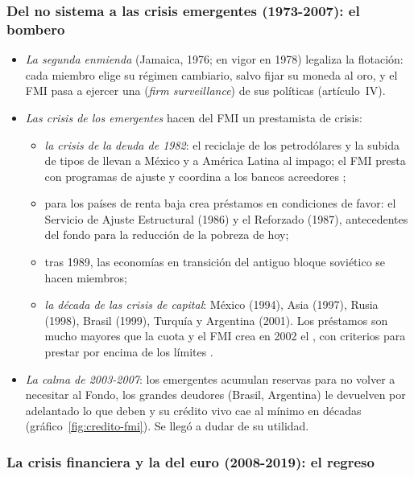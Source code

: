 \documentclass[11pt]{article}
\begin{document}
\subsubsection{Del no sistema a las crisis emergentes (1973-2007): el bombero}\label{sec:no-sistema}

\begin{itemize}
\item \emph{La segunda enmienda} (Jamaica, 1976; en vigor en 1978) legaliza la flotación: cada miembro elige su régimen cambiario, salvo fijar su moneda al oro, y el FMI pasa a ejercer una  (\emph{firm surveillance}) de sus políticas (artículo~IV).
\item \emph{Las crisis de los emergentes} hacen del FMI un prestamista de crisis:
  \begin{itemize}
  \item \emph{la crisis de la deuda de 1982}: el reciclaje de los petrodólares y la subida de tipos de  llevan a México y a América Latina al impago; el FMI presta con programas de ajuste y coordina a los bancos acreedores ;
  \item para los países de renta baja crea préstamos en condiciones de favor: el Servicio de Ajuste Estructural (1986) y el Reforzado (1987), antecedentes del fondo para la reducción de la pobreza de hoy;
  \item tras 1989, las economías en transición del antiguo bloque soviético se hacen miembros;
  \item \emph{la década de las crisis de capital}: México (1994), Asia (1997), Rusia (1998), Brasil (1999), Turquía y Argentina (2001). Los préstamos son mucho mayores que la cuota y el FMI crea en 2002 el , con criterios para prestar por encima de los límites .
  \end{itemize}
\item \emph{La calma de 2003-2007}: los emergentes acumulan reservas para no volver a necesitar al Fondo, los grandes deudores (Brasil, Argentina) le devuelven por adelantado lo que deben y su crédito vivo cae al mínimo en décadas (gráfico~\ref{fig:credito-fmi}). Se llegó a dudar de su utilidad.
\end{itemize}

\subsubsection{La crisis financiera y la del euro (2008-2019): el regreso}\label{sec:crisis-global}
\end{document}
